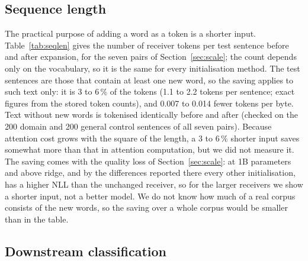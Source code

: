 \documentclass[preprint,12pt]{elsarticle}
\begin{document}
\subsection{Sequence length}
\label{sec:seqlen}
The practical purpose of adding a word as a token is a shorter input. Table~\ref{tab:seqlen} gives the number of receiver tokens per test sentence before and after expansion, for the seven pairs of Section~\ref{sec:scale}; the count depends only on the vocabulary, so it is the same for every initialisation method. The test sentences are those that contain at least one new word, so the saving applies to such text only: it is 3 to 6\,\% of the tokens (1.1 to 2.2 tokens per sentence; exact figures from the stored token counts), and 0.007 to 0.014 fewer tokens per byte. Text without new words is tokenised identically before and after (checked on the 200 domain and 200 general control sentences of all seven pairs). Because attention cost grows with the square of the length, a 3 to 6\,\% shorter input saves somewhat more than that in attention computation, but we did not measure it. The saving comes with the quality loss of Section~\ref{sec:scale}: at 1B parameters and above ridge, and by the differences reported there every other initialisation, has a higher NLL than the unchanged receiver, so for the larger receivers we show a shorter input, not a better model. We do not know how much of a real corpus consists of the new words, so the saving over a whole corpus would be smaller than in the table.
\begin{table}[t]
\centering\small
\caption{Receiver tokens per test sentence (sentences containing at least one new word; PubMed, seed 1) with the words split into pieces and with the new tokens. All rows are recomputed from the stored token counts.}
\label{tab:seqlen}
\resizebox{\textwidth}{!}{}
\end{table}
\subsection{Downstream classification}
\label{sec:downstream}
\begin{table}[t]
\centering\small
\caption{PubMed-RCT test accuracy after fine-tuning the transplanted GPT-2 for 3 epochs (mean $\pm$ sd over seeds).}
\label{tab:ft}
\resizebox{\textwidth}{!}{}
\end{table}
\end{document}
